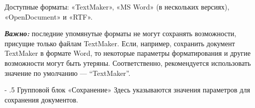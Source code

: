 ﻿\documentclass[a4paper,10pt]{article}
\makeatletter
\renewcommand\paragraph{%
   \@startsection{paragraph}{4}{0mm}%
      {-\baselineskip}%
      {.5\baselineskip}%
      {\normalfont\normalsize\bfseries}}
\makeatother
\begin{document}
 Доступные форматы: «TextMaker», «MS Word» (в нескольких версиях), «OpenDocument» и «RTF».
 
 \begin{mdframed}[backgroundcolor=blue!10]
\textbf{\textit{Важно:}} последние упомянутые форматы не могут сохранять возможности, присущие только файлам TextMaker. Если, например, сохранить документ TextMaker в формате Word, то некоторые параметры форматирования и другие возможности могут быть утеряны. Соответственно, рекомендуется использовать значение по умолчанию — “TextMaker”.
\end{mdframed}
 
 \paragraph{Групповой блок «Сохранение»}
 Здесь указываются значения параметров для сохранения документов.
 
\end{document}
